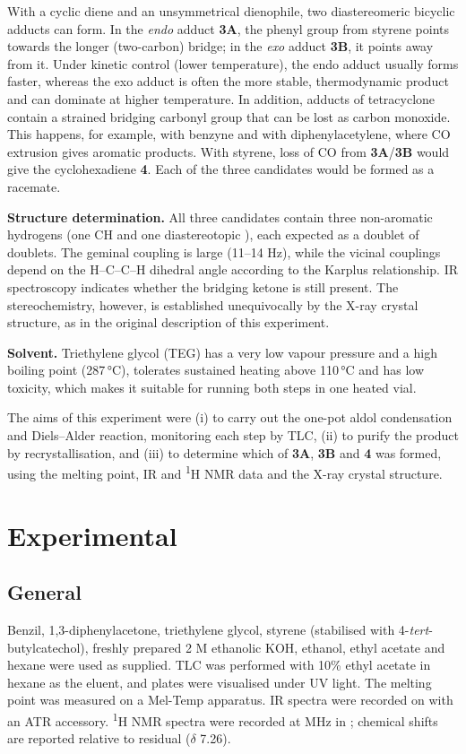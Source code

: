 \documentclass[11pt,a4paper]{article}
\begin{document}
With a cyclic diene and an unsymmetrical dienophile, two diastereomeric bicyclic adducts can form. In the \emph{endo} adduct \textbf{3A}, the phenyl group from styrene points towards the longer (two-carbon) bridge; in the \emph{exo} adduct \textbf{3B}, it points away from it. Under kinetic control (lower temperature), the endo adduct usually forms faster, whereas the exo adduct is often the more stable, thermodynamic product and can dominate at higher temperature.\cite{L2} In addition, adducts of tetracyclone contain a strained bridging carbonyl group that can be lost as carbon monoxide. This happens, for example, with benzyne and with diphenylacetylene, where CO extrusion gives aromatic products.\cite{L2,Fieser1966} With styrene, loss of CO from \textbf{3A}/\textbf{3B} would give the cyclohexadiene \textbf{4}. Each of the three candidates would be formed as a racemate.

\textbf{Structure determination.} All three candidates contain three non-aromatic hydrogens (one CH and one diastereotopic ), each expected as a doublet of doublets. The geminal coupling is large (11--14 Hz), while the vicinal couplings depend on the H--C--C--H dihedral angle according to the Karplus relationship.\cite{Karplus1959,Manual2026} IR spectroscopy indicates whether the bridging ketone is still present. The stereochemistry, however, is established unequivocally by the X-ray crystal structure, as in the original description of this experiment.\cite{Hoang2015}

\textbf{Solvent.} Triethylene glycol (TEG) has a very low vapour pressure and a high boiling point (287\,\si{\celsius}), tolerates sustained heating above 110\,\si{\celsius} and has low toxicity, which makes it suitable for running both steps in one heated vial.\cite{L2}

The aims of this experiment were (i) to carry out the one-pot aldol condensation and Diels--Alder reaction, monitoring each step by TLC, (ii) to purify the product by recrystallisation, and (iii) to determine which of \textbf{3A}, \textbf{3B} and \textbf{4} was formed, using the melting point, IR and \textsuperscript{1}H NMR data and the X-ray crystal structure.

\section{Experimental}

\subsection{General}
Benzil, 1,3-diphenylacetone, triethylene glycol, styrene (stabilised with 4-\emph{tert}-butylcatechol), freshly prepared 2 M ethanolic KOH, ethanol, ethyl acetate and hexane were used as supplied. TLC was performed with 10\% ethyl acetate in hexane as the eluent, and plates were visualised under UV light. The melting point was measured on a Mel-Temp apparatus. IR spectra were recorded on  with an ATR accessory. \textsuperscript{1}H NMR spectra were recorded at  MHz in ; chemical shifts are reported relative to residual  ($\delta$ 7.26).\cite{Fulmer2010}
\end{document}
